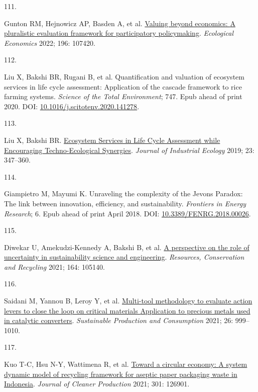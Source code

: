 \documentclass[
  11pt,
  a4paperpaper,
  onecolumn]{article}
\newlength{\cslhangindent}
\newlength{\csllabelwidth}
\newlength{\cslentryspacingunit} %
\newenvironment{CSLReferences}[2] %
 {%
  \setlength{\parindent}{0pt}
  \ifodd #1
  \let\oldpar\par
  \def\par{\hangindent=\cslhangindent\oldpar}
  \fi
  \setlength{\parskip}{#2\cslentryspacingunit}
 }%
 {}
\newcommand{\CSLLeftMargin}[1]{\parbox[t]{\csllabelwidth}{#1}}
\newcommand{\CSLRightInline}[1]{\parbox[t]{\linewidth - \csllabelwidth}{#1}\break}
\begin{document}
\begin{CSLReferences}{0}{0}
\leavevmode{}%
\CSLLeftMargin{111. }%
\CSLRightInline{Gunton RM, Hejnowicz AP, Basden A, et al.
\href{https://doi.org/10.1016/j.ecolecon.2022.107420}{Valuing beyond
economics: {A} pluralistic evaluation framework for participatory
policymaking}. \emph{Ecological Economics} 2022; 196: 107420.}

\leavevmode{}%
\CSLLeftMargin{112. }%
\CSLRightInline{Liu X, Bakshi BR, Rugani B, et al. Quantification and
valuation of ecosystem services in life cycle assessment: {Application}
of the cascade framework to rice farming systems. \emph{Science of the
Total Environment}; 747. Epub ahead of print 2020. DOI:
\href{https://doi.org/10.1016/j.scitotenv.2020.141278}{10.1016/j.scitotenv.2020.141278}.}

\leavevmode{}%
\CSLLeftMargin{113. }%
\CSLRightInline{Liu X, Bakshi BR.
\href{https://doi.org/10.1111/jiec.12755}{Ecosystem {Services} in {Life
Cycle Assessment} while {Encouraging Techno}-{Ecological Synergies}}.
\emph{Journal of Industrial Ecology} 2019; 23: 347--360.}

\leavevmode{}%
\CSLLeftMargin{114. }%
\CSLRightInline{Giampietro M, Mayumi K. Unraveling the complexity of the
{Jevons Paradox}: {The} link between innovation, efficiency, and
sustainability. \emph{Frontiers in Energy Research}; 6. Epub ahead of
print April 2018. DOI:
\href{https://doi.org/10.3389/FENRG.2018.00026}{10.3389/FENRG.2018.00026}.}

\leavevmode{}%
\CSLLeftMargin{115. }%
\CSLRightInline{Diwekar U, Amekudzi-Kennedy A, Bakshi B, et al.
\href{https://doi.org/10.1016/j.resconrec.2020.105140}{A perspective on
the role of uncertainty in sustainability science and engineering}.
\emph{Resources, Conservation and Recycling} 2021; 164: 105140.}

\leavevmode{}%
\CSLLeftMargin{116. }%
\CSLRightInline{Saidani M, Yannou B, Leroy Y, et al.
\href{https://doi.org/10.1016/j.spc.2021.01.010}{Multi-tool methodology
to evaluate action levers to close the loop on critical materials
\textendash{} {Application} to precious metals used in catalytic
converters}. \emph{Sustainable Production and Consumption} 2021; 26:
999--1010.}

\leavevmode{}%
\CSLLeftMargin{117. }%
\CSLRightInline{Kuo T-C, Hsu N-Y, Wattimena R, et al.
\href{https://doi.org/10.1016/j.jclepro.2021.126901}{Toward a circular
economy: {A} system dynamic model of recycling framework for aseptic
paper packaging waste in {Indonesia}}. \emph{Journal of Cleaner
Production} 2021; 301: 126901.}


\end{CSLReferences}
\end{document}
